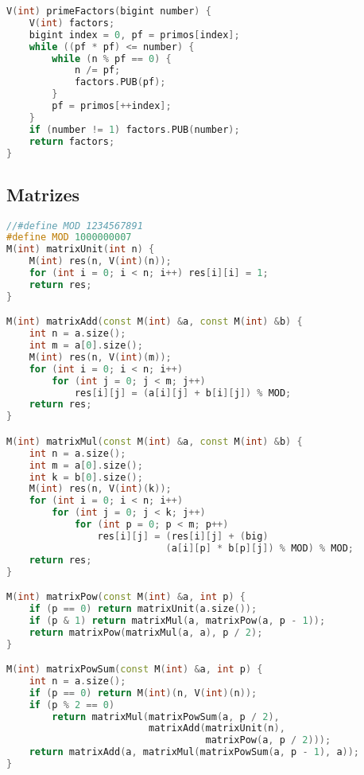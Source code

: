\newpage

\begin{lstlisting}[language=C++, title={Fatores Primos}]
V(int) primeFactors(bigint number) {
    V(int) factors;
    bigint index = 0, pf = primos[index];
    while ((pf * pf) <= number) {
        while (n % pf == 0) {
            n /= pf;
            factors.PUB(pf);
        }
        pf = primos[++index];
    }
    if (number != 1) factors.PUB(number);
    return factors;
}
\end{lstlisting}

\newpage

\subsection{Matrizes}
\begin{lstlisting}[language=C++]
//#define MOD 1234567891
#define MOD 1000000007
M(int) matrixUnit(int n) {
    M(int) res(n, V(int)(n));
    for (int i = 0; i < n; i++) res[i][i] = 1;
    return res;
}

M(int) matrixAdd(const M(int) &a, const M(int) &b) {
    int n = a.size();
    int m = a[0].size();
    M(int) res(n, V(int)(m));
    for (int i = 0; i < n; i++)
        for (int j = 0; j < m; j++)
            res[i][j] = (a[i][j] + b[i][j]) % MOD;
    return res;
}

M(int) matrixMul(const M(int) &a, const M(int) &b) {
    int n = a.size();
    int m = a[0].size();
    int k = b[0].size();
    M(int) res(n, V(int)(k));
    for (int i = 0; i < n; i++)
        for (int j = 0; j < k; j++)
            for (int p = 0; p < m; p++)
                res[i][j] = (res[i][j] + (big)
                			(a[i][p] * b[p][j]) % MOD) % MOD;
    return res;
}

M(int) matrixPow(const M(int) &a, int p) {
    if (p == 0) return matrixUnit(a.size());
    if (p & 1) return matrixMul(a, matrixPow(a, p - 1));
    return matrixPow(matrixMul(a, a), p / 2);
}

M(int) matrixPowSum(const M(int) &a, int p) {
    int n = a.size();
    if (p == 0) return M(int)(n, V(int)(n));
    if (p % 2 == 0)
        return matrixMul(matrixPowSum(a, p / 2),
        				 matrixAdd(matrixUnit(n), 
                        		   matrixPow(a, p / 2)));
    return matrixAdd(a, matrixMul(matrixPowSum(a, p - 1), a));
}
\end{lstlisting}

